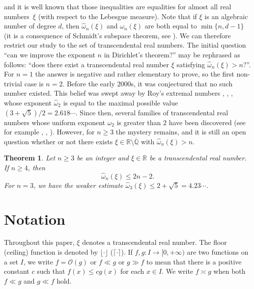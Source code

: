 \documentclass[10pt,a4paper]{amsart}
\numberwithin{equation}{section}
\newcommand\bQ{\mathbb{Q}}
\newcommand\bR{\mathbb{R}}
\newcommand\GrO{\mathcal{O}}
\newcommand\homega{\widehat{\omega}}\newcommand\HH{\mathcal{H}}
\theoremstyle{definition}
\theoremstyle{plain}
\newtheorem{Thm}{Theorem}[section]
\begin{document}
and it is well known that those inequalities are equalities for almost all real numbers~$\xi$ (with respect to the Lebesgue measure). Note that if $\xi$ is an algebraic number of degree $d$, then $\homega_n(\xi)$ and $\omega_n(\xi)$ are both equal to $\min\{n,d-1\}$ (it is a consequence of Schmidt's subspace theorem, see \cite[Th.\,2.10]{bugeaud2015exponents}). We can therefore restrict our study to the set of transcendental real numbers. The initial question ``can we improve the exponent $n$ in Dirichlet's theorem?'' may be rephrased as follows: ``does there exist a transcendental real number $\xi$ satisfying $\homega_n(\xi) > n$?''. For $n=1$ the answer is negative and rather elementary to prove, so the first non-trivial case is $n=2$. Before the early $2000$s, it was conjectured that no such number existed. This belief was swept away by Roy's extremal numbers \cite{roy2003approximation}, \cite{roy2004approximation}, \cite{arbourRoyCriterionDegreTwo}, whose exponent $\homega_2$ is equal to the maximal possible value $(3+\sqrt 5)/2 = 2.618\cdots$. Since then, several families of transcendental real numbers whose uniform exponent $\homega_2$ is greater than $2$ have been discovered (see for example \cite{roy2007two}, \cite{bugeaud2005exponentsSturmian}, \cite{poels2017exponents, poelsExpoGeneralClass2021}). However, for $n \geq 3$ the mystery remains, and it is still an open question whether or not there exists $\xi\in\bR\setminus\overline{\bQ}$ with $\homega_n(\xi) > n$.
\begin{Thm}
\label{Thm : main d=2}
Let $n\geq 3$ be an integer and $\xi\in\bR$ be a transcendental real number. If $n\geq 4$, then
\begin{equation*}
\homega_n(\xi) \leq 2n-2.
\end{equation*}
For $n=3$, we have the weaker estimate $\homega_3(\xi)\leq 2+\sqrt 5 = 4.23\cdots$.
\end{Thm}
\setcounter{section}{1}
\section{Notation}
\label{section: notation}
Throughout this paper, $\xi$ denotes a transcendental real number. The floor (\resp ceiling) function is denoted by $\lfloor \cdot \rfloor$ (\resp $\lceil \cdot \rceil$). If $f, g : I \to [0, +\infty)$ are two functions on a set $I$, we write $f = \GrO(g)$ or $f \ll g$ or $g \gg f$ to mean that there is a positive constant $c$ such that $f (x) \leq cg(x)$ for each $x\in I$. We write $f \asymp g$ when both $f \ll g$ and $g \ll f$ hold.
\end{document}
